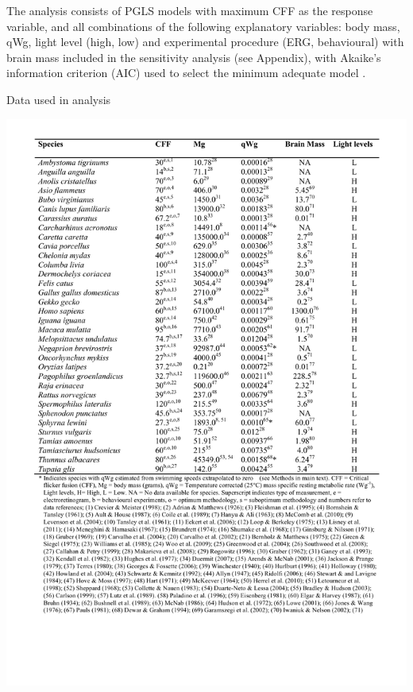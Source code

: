 The analysis consists of PGLS models with maximum CFF as the response variable, and all combinations of the following explanatory variables: body mass, qWg, light level (high, low) and experimental procedure (ERG, behavioural) with brain mass included in the sensitivity analysis (see Appendix), with Akaike's information criterion (AIC) used to select the minimum adequate model \citep{burnham2002model}.


\begin{table}[h!]
  \caption[Table 1.]{Data used in analysis}
  \label{tbl:Table 1.}
  \includegraphics[width=\linewidth]{ch2-time/Table_1}
\end{table}


